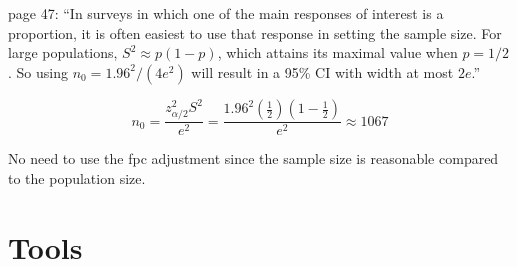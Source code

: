 \documentclass{article}
\theoremstyle{definition}
\begin{document}
\begin{flushleft}
\cite{lohr2019} page 47:
``In surveys in which one of the main responses of interest
is a proportion, it is often easiest to use that response
in setting the sample size.
For large populations, $S^2 \approx p(1-p)$, which
attains its maximal value when $p=1/2$. So using
$n_0=1.96^2/(4e^2)$ will result in a 95\% CI with width at most
$2e$.''

$$
	n_0
	=
	\frac{
		z^2_{\alpha/2}S^2
	}{
		e^2
	}
	=
	\frac{
		1.96^2(\frac{1}{2})(1-\frac{1}{2})
	}{
		e^2
	}
	\approx
	1067
$$

No need to use the fpc adjustment since the sample size
is reasonable compared to the population size.

\section{Tools} \label{sec:tools}


\end{flushleft}
\printbibliography
\end{document}
